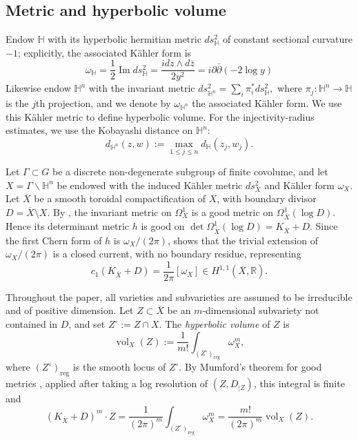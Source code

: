 \documentclass[12 pt]{amsart}
\theoremstyle{definition}
\newcommand{\Hu}{\mathbb{H}}
\begin{document}
\subsection{Metric and hyperbolic volume} Endow $\Hu$ with its hyperbolic hermitian metric $ds^2_\Hu$ of constant sectional curvature $-1$; explicitly, the associated K\"ahler form is 
$$\omega_\Hu=\frac{1}{2}\operatorname{Im} ds_\Hu^2=\frac{idz\wedge d\bar z}{2y^2}=i\partial\bar\partial (-2\log y)$$
Likewise endow $\Hu^n$ with the invariant metric
$ds^2_{\Hu^n}=\sum_i \pi_i^* ds^2_{\Hu},$
where $\pi_j:\Hu^n\rightarrow \Hu$ is the $j$th projection, and we denote by $\omega_{\Hu^n}$ the associated K\"ahler form. We use this Kähler metric to define hyperbolic volume. For the injectivity-radius estimates, we use the Kobayashi distance
on $\mathbb H^n:$
\[
d_{\mathbb H^n}(z,w)
:=
\max_{1\leq j\leq n}d_{\mathbb H}(z_j,w_j).
\]

Let $\Gamma\subset G$ be a discrete non-degenerate subgroup of finite covolume, and let
\(X=\Gamma\backslash \Hu^n\)
be endowed with the induced Kähler metric $ds_X^2$ and Kähler form $\omega_X$. Let
$\overline X$ be a smooth toroidal compactification of $X$, with boundary divisor
$D=\overline X\setminus X$. By
\cite[Theorem~3.1, Proposition~3.4(a)]{mumford1977hirzebruch},
the invariant metric on \(\Omega_X^1\) is a good metric on
\(\Omega_{\overline X}^1(\log D)\). Hence its determinant metric
\(h\) is good on
\(\det\Omega_{\overline X}^1(\log D)=K_{\overline X}+D\). Since the
first Chern form of \(h\) is \(\omega_X/(2\pi)\),
\cite[Propositions~1.1--1.2, Theorem~1.4]{mumford1977hirzebruch}
shows that
the trivial extension of \(\omega_X/(2\pi)\) is a closed current, with
no boundary residue, representing
\begin{equation}\label{ChernForm}
c_1(K_{\overline X}+D)
=\frac{1}{2\pi}[\omega_X]\in H^{1,1}(\overline X,\mathbb R).
\end{equation}

 Throughout the paper, all varieties and subvarieties are assumed to be
irreducible and of positive dimension. Let $Z\subset \overline X$ be an $m$-dimensional subvariety not contained
in $D$, and set $Z^\circ:=Z\cap X$. The \emph{hyperbolic volume} of $Z$ is
\[
\operatorname{vol}_{X}(Z)
:=
\frac{1}{m!}
\int_{(Z^\circ)_{\mathrm{reg}}}\omega_X^m,
\]
where $(Z^\circ)_{\mathrm{reg}}$ is the smooth locus of $Z^\circ$. By Mumford's theorem for good metrics
\cite{mumford1977hirzebruch},
applied after taking a log resolution of \((Z,D_{|Z})\), this integral
is finite and
\begin{equation}\label{degree-volume}
(K_{\overline X}+D)^m\cdot Z
=
\frac{1}{(2\pi)^m}
\int_{(Z^\circ)_{\mathrm{reg}}}\omega_X^m
=
\frac{m!}{(2\pi)^m}\operatorname{vol}_{X}(Z).
\end{equation}
\end{document}
